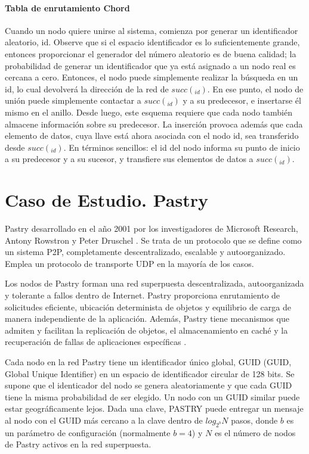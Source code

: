  

\paragraph{Tabla de enrutamiento Chord}

 Cuando un nodo quiere unirse al sistema, comienza por generar un identificador aleatorio, id. Observe que si el espacio identificador es lo suficientemente
grande, entonces proporcionar el generador del número aleatorio es de buena calidad; la probabilidad de generar un identificador que ya está asignado a un nodo real es cercana a cero.
Entonces, el nodo puede simplemente realizar la búsqueda en un id, lo cual devolverá la dirección de la red de $succ(_{id})$. En ese punto, el nodo de unión puede simplemente contactar a  $succ(_{id})$ y a su predecesor, e insertarse él mismo en el anillo. Desde luego, este esquema requiere que cada nodo también almacene información sobre su predecesor. La inserción provoca además que cada elemento de datos, cuya llave está ahora asociada con el nodo id, sea transferido desde  $succ(_{id})$.
En términos sencillos: el id del nodo informa su punto de inicio a su predecesor y a su sucesor, y transfiere sus elementos de datos a  $succ(_{id})$.

 \section{Caso de Estudio. Pastry}
 

 Pastry desarrollado en el año 2001 por los investigadores de Microsoft Research, Antony Rowstron y Peter Druschel \cite{Rowstron2001}.   Se trata de un protocolo que se define como un sistema P2P, completamente descentralizado, escalable y autoorganizado. Emplea un protocolo de transporte UDP en la mayoría de los casos.

  Los nodos de Pastry forman una red superpuesta descentralizada, autoorganizada y tolerante a fallos dentro de Internet. Pastry proporciona enrutamiento de solicitudes eficiente, ubicación determinista de objetos y equilibrio de carga de manera independiente de la aplicación. Además, Pastry tiene mecanismos que admiten y facilitan la replicación de objetos, el almacenamiento en caché y la recuperación de fallas de aplicaciones específicas \cite{Goetz2005}. 
  
Cada nodo en la red Pastry tiene un identificador único global, GUID  (GUID, Global Unique Identifier)   en un espacio de identificador circular de 128 bits. Se supone que el identicador del nodo se genera aleatoriamente y que cada GUID tiene la misma probabilidad de ser elegido. Un nodo con un GUID similar puede estar geográficamente lejos.
 Dada una clave, PASTRY puede entregar un mensaje al nodo con el GUID más cercano a la clave dentro de   $log_{2^{b}}N$ pasos, donde $b$ es un parámetro de configuración (normalmente $b = 4$) y $N$ es el número de nodos de Pastry activos en la red superpuesta.
 
